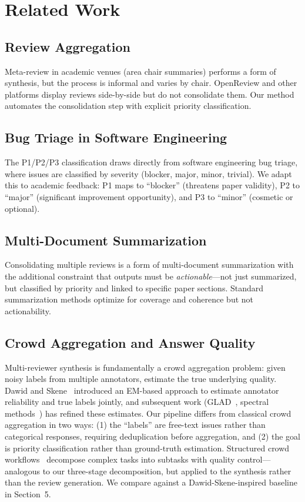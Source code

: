 \section{Related Work}

\subsection{Review Aggregation}

Meta-review in academic venues (area chair summaries) performs a form of synthesis, but the process is informal and varies by chair. OpenReview and other platforms display reviews side-by-side but do not consolidate them. Our method automates the consolidation step with explicit priority classification.

\subsection{Bug Triage in Software Engineering}

The P1/P2/P3 classification draws directly from software engineering bug triage, where issues are classified by severity (blocker, major, minor, trivial). We adapt this to academic feedback: P1 maps to ``blocker'' (threatens paper validity), P2 to ``major'' (significant improvement opportunity), and P3 to ``minor'' (cosmetic or optional).

\subsection{Multi-Document Summarization}

Consolidating multiple reviews is a form of multi-document summarization with the additional constraint that outputs must be \emph{actionable}---not just summarized, but classified by priority and linked to specific paper sections. Standard summarization methods optimize for coverage and coherence but not actionability.

\subsection{Crowd Aggregation and Answer Quality}

Multi-reviewer synthesis is fundamentally a crowd aggregation problem: given noisy labels from multiple annotators, estimate the true underlying quality. Dawid and Skene~\cite{dawid1979} introduced an EM-based approach to estimate annotator reliability and true labels jointly, and subsequent work (GLAD~\cite{whitehill2009}, spectral methods~\cite{zhang2014spectral}) has refined these estimates. Our pipeline differs from classical crowd aggregation in two ways: (1) the ``labels'' are free-text issues rather than categorical responses, requiring deduplication before aggregation, and (2) the goal is priority classification rather than ground-truth estimation. Structured crowd workflows~\cite{bernstein2015crowd} decompose complex tasks into subtasks with quality control---analogous to our three-stage decomposition, but applied to the synthesis rather than the review generation. We compare against a Dawid-Skene-inspired baseline in Section~5.

